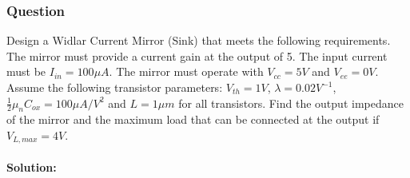 \subsubsection{Question}
Design a Widlar Current Mirror (Sink) that meets
the following requirements. The mirror must provide
a current gain at the output of 5. The input current
must be $I_{in} = 100 \mu A$. The mirror must operate
with $V_{cc} = 5V$ and $V_{ee} = 0V$. Assume the
following transistor parameters: $V_{th} = 1V$,
$\lambda = 0.02 V^{-1}$, $\frac{1}{2} \mu_n C_{ox} =
100 \mu A/V^2$ and $L = 1 \mu m$ for all transistors.
Find the output impedance of the mirror and the
maximum load that can be connected at the output
if $V_{L, max} = 4V$.
\paragraph{Solution:}
